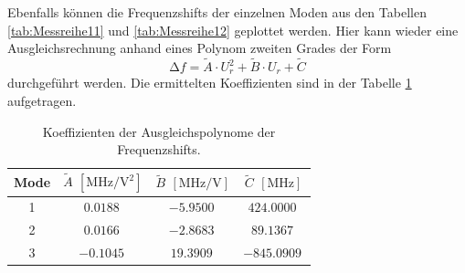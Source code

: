 Ebenfalls können die Frequenzshifts der einzelnen Moden aus den Tabellen \ref{tab:Messreihe11} und \ref{tab:Messreihe12} geplottet werden. Hier kann wieder eine Ausgleichsrechnung anhand eines Polynom zweiten Grades der Form 
\begin{equation*}
\increment f = \tilde{A} \cdot U_{r}^2 + \tilde{B} \cdot  U_{r} + \tilde{C}
\end{equation*}
durchgeführt werden. Die ermittelten Koeffizienten sind in der Tabelle \ref{tab:12} aufgetragen.
\begin{table}
    \centering
    \caption{Koeffizienten der Ausgleichspolynome der Frequenzshifts.} 
    \label{tab:12}
    \begin{tabular}{c | c c c}
        \toprule
        Mode & $\tilde{A}$ $[\si{\mega\hertz\per\volt\squared}] $ & $\tilde{B} $ $[\si{\mega\hertz\per\volt}] $ & $\tilde{C}$ $[\si{\mega\hertz}]$ \\
        \midrule
        1      &      $\SI{0.0188}{}$        &       $\SI{-5.9500}{}$              &        $\SI{424.0000}{}$ \\
        2      &      $\SI{0.0166}{}$        &       $\SI{-2.8683}{}$              &        $\SI{89.1367}{}$ \\
        3      &      $\SI{-0.1045}{}$        &       $\SI{19.3909}{}$              &        $\SI{-845.0909}{}$ \\
        
    \end{tabular}
\end{table}

